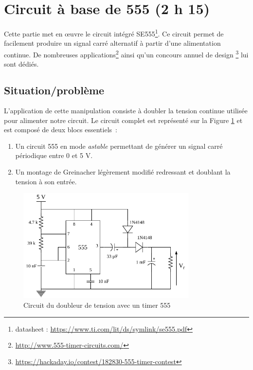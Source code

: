 \documentclass{../../template/labo}
\begin{document}
{

}



\clearpage







\section{Circuit à base de 555 (2 h 15)}
Cette partie met en œuvre le circuit intégré SE555\footnote{datasheet : \url{https://www.ti.com/lit/ds/symlink/se555.pdf}}. Ce circuit permet de facilement produire un signal carré alternatif à partir d'une alimentation continue. De nombreuses applications\footnote{\url{http://www.555-timer-circuits.com/}} ainsi qu'un concours annuel de design \footnote{\url{https://hackaday.io/contest/182830-555-timer-contest}} lui sont dédiés.


\subsection{Situation/problème}

L'application de cette manipulation consiste à doubler la tension continue utilisée pour alimenter notre circuit. Le circuit complet est représenté sur la Figure \ref{Doubleur} et est composé de deux blocs essentiels~:
\begin{enumerate}
	\item Un circuit 555 en mode \textit{astable} permettant de générer un signal carré périodique entre 0 et 5 V.
	\item Un montage de Greinacher légèrement modifié redressant et doublant la tension à son entrée.
\end{enumerate}

\begin{figure}[ht]
\centering
\includegraphics[width=0.8\textwidth]{555-doubler.pdf}
\caption{Circuit du doubleur de tension avec un timer 555}
\label{Doubleur}
\end{figure}
\end{document}
